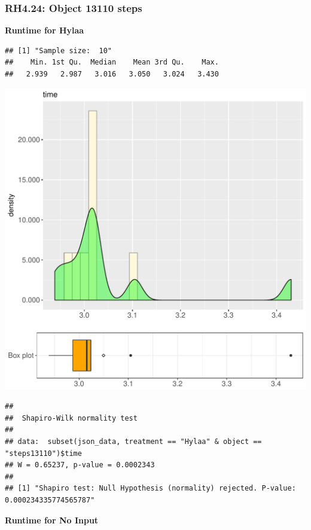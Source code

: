 \documentclass{article}\usepackage[]{graphicx}\usepackage[]{color}
\makeatletter
\def\maxwidth{ %
  \ifdim\Gin@nat@width>\linewidth
    \linewidth
  \else
    \Gin@nat@width
  \fi
}
\newenvironment{kframe}{%
 \def\at@end@of@kframe{}%
 \ifinner\ifhmode%
  \def\at@end@of@kframe{\end{minipage}}%
  \begin{minipage}{\columnwidth}%
 \fi\fi%
 \def\FrameCommand##1{\hskip\@totalleftmargin \hskip-\fboxsep
 \colorbox{shadecolor}{##1}\hskip-\fboxsep
     \hskip-\linewidth \hskip-\@totalleftmargin \hskip\columnwidth}%
 \MakeFramed {\advance\hsize-\width
   \@totalleftmargin\z@ \linewidth\hsize
   \@setminipage}}%
 {\par\unskip\endMakeFramed%
 \at@end@of@kframe}
\newenvironment{knitrout}{}{} %
\makeatother
\begin{document}
\subsubsection{RH4.24: Object 13110 steps}

 \textbf{Runtime for Hylaa}
\begin{knitrout}
\color{fgcolor}\begin{kframe}
\begin{verbatim}
## [1] "Sample size:  10"
##    Min. 1st Qu.  Median    Mean 3rd Qu.    Max. 
##   2.939   2.987   3.016   3.050   3.024   3.430
\end{verbatim}
\end{kframe}
\includegraphics[width=\maxwidth]{figure/RH4_Hylaa_steps13110-1} 
\begin{kframe}\begin{verbatim}
## 
## 	Shapiro-Wilk normality test
## 
## data:  subset(json_data, treatment == "Hylaa" & object == "steps13110")$time
## W = 0.65237, p-value = 0.0002343
## 
## [1] "Shapiro test: Null Hypothesis (normality) rejected. P-value: 0.000234335774565787"
\end{verbatim}
\end{kframe}
\end{knitrout}
 \textbf{Runtime for No Input}
\end{document}
